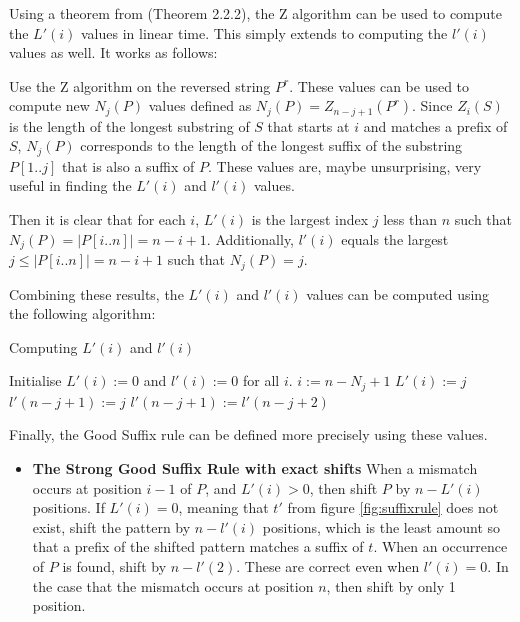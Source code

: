 Using a theorem from \cite{Gusfield1997AlgorithmsOS} (Theorem 2.2.2), the Z algorithm can be used to compute the $L'(i)$ values in linear time. This simply extends to computing the $l'(i)$ values as well. It works as follows:

Use the Z algorithm on the reversed string $P^r$. These values can be used to compute new $N_j(P)$ values defined as $N_j(P)=Z_{n-j+1}(P^r)$. Since $Z_i(S)$ is the length of the longest substring of $S$ that starts at $i$ and matches a prefix of $S$, $N_j(P)$ corresponds to the length of the longest suffix of the substring $P[1..j]$ that is also a suffix of $P$. These values are, maybe unsurprising, very useful in finding the $L'(i)$ and $l'(i)$ values. 

Then it is clear that for each $i$, $L'(i)$ is the largest index $j$ less than $n$ such that $N_j(P)=|P[i..n]|=n-i+1$. Additionally, $l'(i)$ equals the largest $j\leq|P[i..n]|=n-i+1$ such that $N_j(P)=j$. 

Combining these results, the $L'(i)$ and $l'(i)$ values can be computed using the following algorithm:

\begin{algorithm}
\caption{Computing $L'(i)$ and $l'(i)$}\label{alg:Lvalues}
\begin{algorithmic}
\State Initialise $L'(i):=0$ and $l'(i):=0$ for all $i$. 
        \State $i:=n-N_j+1$
        \State $L'(i):=j$
    \EndIf
\EndFor
{}
    \State $l'(n-j+1) := j$
    \Else
    \State $l'(n-j+1) := l'(n-j+2)$ 
    \EndIf
\EndFor
\end{algorithmic}
\end{algorithm}

Finally, the Good Suffix rule can be defined more precisely using these values. 

\begin{itemize}
    \item[] \textbf{The Strong Good Suffix Rule with exact shifts} When a mismatch occurs at position $i-1$ of $P$, and $L'(i)>0$, then shift $P$ by $n-L'(i)$ positions. If $L'(i)=0$, meaning that $t'$ from figure \ref{fig:suffixrule} does not exist, shift the pattern by $n-l'(i)$ positions, which is the least amount so that a prefix of the shifted pattern matches a suffix of $t$. When an occurrence of $P$ is found, shift by $n-l'(2)$. These are correct even when $l'(i)=0$. In the case that the mismatch occurs at position $n$, then shift by only 1 position. 
\end{itemize}


